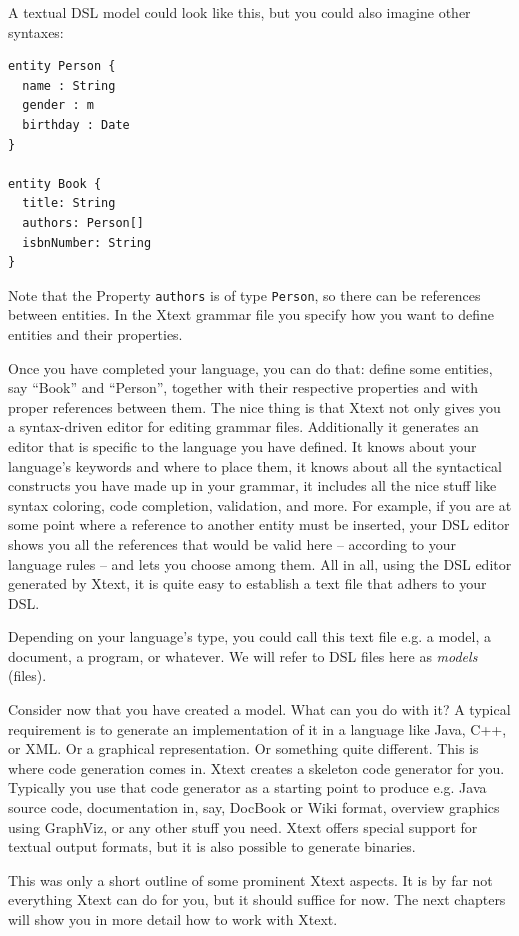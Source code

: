A textual DSL model could look like this, but you could also imagine other
syntaxes:
\begin{lstlisting}
entity Person {
  name : String
  gender : m
  birthday : Date
}

entity Book {
  title: String
  authors: Person[]
  isbnNumber: String
}
\end{lstlisting}

Note that the Property \texttt{authors} is of type \texttt{Person}, so there can
be references between entities. In the Xtext grammar file you specify how you
want to define entities and their properties.

Once you have completed your language, you can do that: define some entities,
say ``Book'' and ``Person'', together with their respective properties and with
proper references between them. The nice thing is that Xtext not only gives you
a syntax-driven editor for editing grammar files. Additionally it generates an
editor that is specific to the language you have defined. It knows about your
language's keywords and where to place them, it knows about all the syntactical
constructs you have made up in your grammar, it includes all the nice stuff like
syntax coloring, code completion, validation, and more. For example, if you are
at some point where a reference to another entity must be inserted, your DSL
editor shows you all the references that would be valid here -- according to
your language rules -- and lets you choose among them. All in all, using the DSL
editor generated by Xtext, it is quite easy to establish a text file that adhers
to your DSL.

Depending on your language's type, you could call this text file e.g. a model, a
document, a program, or whatever. We will refer to DSL files here as
\emph{models} (files).

Consider now that you have created a model. What can you do with it? A typical
requirement is to generate an implementation of it in a language like Java, C++,
or XML. Or a graphical representation. Or something quite different. This is
where code generation comes in. Xtext creates a skeleton
code generator for you. Typically you use that code generator as a starting
point to produce e.g. Java source code, documentation in, say, DocBook or Wiki
format, overview graphics using GraphViz, or any other stuff you need. Xtext
offers special support for textual output formats, but it is also possible to
generate binaries.

This was only a short outline of some prominent Xtext aspects. It is by far not
everything Xtext can do for you, but it should suffice for now. The next
chapters will show you in more detail how to work with Xtext.
